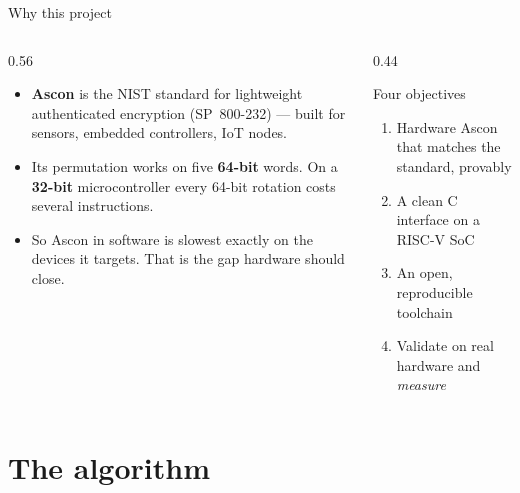 \documentclass[aspectratio=169,11pt]{beamer}
\begin{document}
\begin{frame}{Why this project}
\begin{columns}[T]
\begin{column}{0.56\textwidth}
\begin{itemize}
\item \textbf{Ascon} is the NIST standard for lightweight authenticated
      encryption (SP~800-232) --- built for sensors, embedded controllers, IoT
      nodes.
\item Its permutation works on five \textbf{64-bit} words. On a \textbf{32-bit}
      microcontroller every 64-bit rotation costs several instructions.
\item So Ascon in software is slowest exactly on the devices it targets.
      That is the gap hardware should close.
\end{itemize}
\end{column}
\begin{column}{0.44\textwidth}
\begin{block}{Four objectives}
\small
\begin{enumerate}
\item Hardware Ascon that matches the standard, provably
\item A clean C interface on a RISC-V SoC
\item An open, reproducible toolchain
\item Validate on real hardware and \emph{measure}
\end{enumerate}
\end{block}
\end{column}
\end{columns}
\end{frame}

\section{The algorithm}
\end{document}
